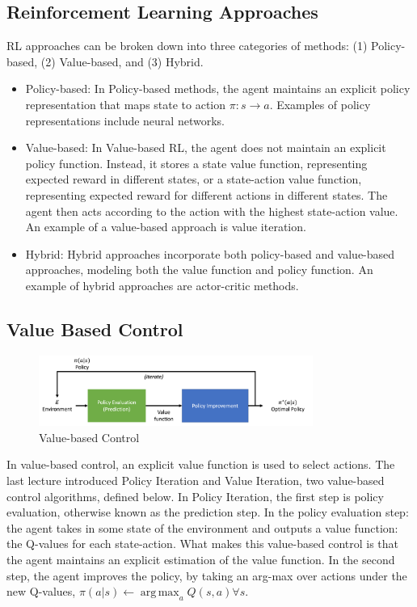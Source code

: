\documentclass[11pt]{article}
\DeclareMathOperator*{\argmax}{arg\,max}
\begin{document}
\subsection{Reinforcement Learning Approaches}
RL approaches can be broken down into three categories of methods: (1) Policy-based, (2) Value-based, and (3) Hybrid. 
\begin{itemize}
    \item Policy-based: In Policy-based methods, the agent maintains an explicit policy representation that maps state to action $\pi: s \rightarrow a$. Examples of policy representations include neural networks. 
    \item Value-based: In Value-based RL, the agent does not maintain an explicit policy function. Instead, it stores a state value function, representing expected reward in different states, or a state-action value function, representing expected reward for different actions in different states. The agent then acts according to the action with the highest state-action value. An example of a value-based approach is value iteration. 
    \item Hybrid: Hybrid approaches incorporate both policy-based and value-based approaches, modeling both the value function and policy function. An example of hybrid approaches are actor-critic methods.
\end{itemize}

\subsection{Value Based Control}
\begin{figure}[H]
    \centering
    \includegraphics[width=0.8\textwidth]{images/value_based_control.png}
    \caption{Value-based Control}
    \label{fig:vbc}
\end{figure}

In value-based control, an explicit value function is used to select actions. The last lecture introduced Policy Iteration and Value Iteration, two value-based control algorithms, defined below. In Policy Iteration, the first step is policy evaluation, otherwise known as the prediction step. In the policy evaluation step: the agent takes in some state of the environment and outputs a value function: the Q-values for each state-action. What makes this value-based control is that the agent maintains an explicit estimation of the value function. In the second step, the agent improves the policy, by taking an arg-max over actions under the new Q-values, $\pi(a|s) \leftarrow \argmax_a Q(s,a) \forall s$. 
\end{document}
